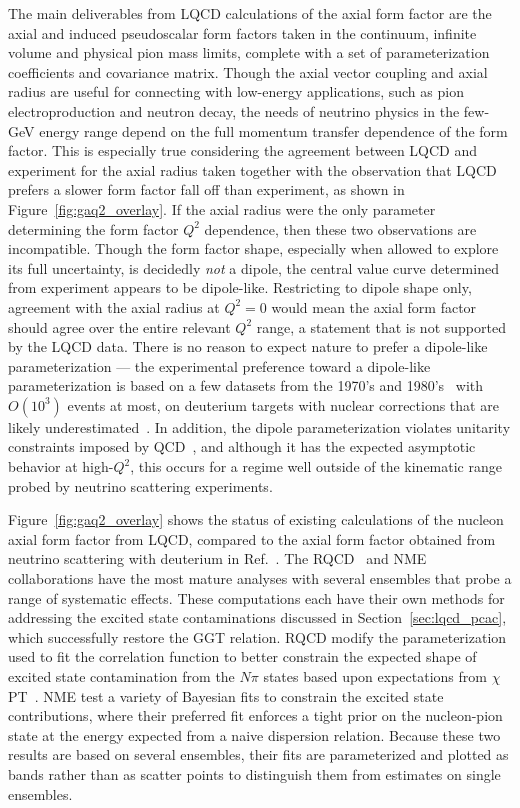 \documentclass{ar-1col}
\def\asm#1{{\color{blue}#1}}
\begin{document}
The main deliverables from LQCD calculations of the axial form factor
 are the axial and induced pseudoscalar form factors taken in the continuum,
 infinite volume and physical pion mass limits, complete with a set of parameterization coefficients
 and covariance matrix.
Though the axial \asm{vector coupling}
 and \asm{axial }radius are useful for connecting with low-energy applications,
 such as pion electroproduction and neutron decay,
 the needs of neutrino physics in the few-GeV energy range depend
 on the full momentum transfer dependence of the form factor.
 This is especially true considering the agreement between LQCD and experiment
 for the axial radius taken together with the observation that
 LQCD prefers a slower form factor fall off than experiment,
 as shown in Figure~\ref{fig:gaq2_overlay}.
If the axial radius were the only parameter determining the form factor $Q^2$ dependence,
 then these two observations are incompatible.
Though the form factor shape, especially when allowed to explore its full uncertainty,
 is decidedly \emph{not} a dipole, the central value curve determined
 from experiment appears to be dipole-like.
Restricting to dipole shape only, agreement with the axial radius at $Q^2=0$
 would mean the axial form factor should agree over the entire relevant $Q^2$ range,
 a statement that is not supported by the LQCD data.
There is no reason to expect nature to prefer a dipole-like parameterization ---
 the experimental preference toward a dipole-like parameterization is based on
 a few datasets from the 1970's and 1980's~\cite{ANL_Barish_1977, BNL_Baker_1981, Kitagaki:1983px}
 with $O(10^3)$ events at most,
 on deuterium targets with nuclear corrections that are likely underestimated~\cite{Meyer:2016oeg}.
In addition, the dipole parameterization violates
 unitarity constraints imposed by QCD~\cite{Bhattacharya:2011ah},
 and although it has the expected asymptotic behavior at high-$Q^2$,
 this occurs for a regime well outside of the kinematic range probed
 by neutrino scattering experiments.



Figure~\ref{fig:gaq2_overlay} shows the status of existing calculations of
 the nucleon axial form factor from LQCD,
 compared to the axial form factor obtained from neutrino scattering
 with deuterium in Ref.~\cite{Meyer:2016oeg}.
The RQCD~\cite{RQCD:2019jai} and NME~\cite{Park:2021ypf} collaborations
 have the most mature analyses with several ensembles that probe a range of
 systematic effects.
These computations each have their own methods for addressing the
 excited state contaminations discussed in Section~\ref{sec:lqcd_pcac},
 which successfully restore the GGT relation.
RQCD modify the parameterization used to fit the correlation function
 to better constrain the expected shape of excited state contamination from the $N\pi$ states based upon expectations from $\chi$PT~\cite{Bar:2018xyi}.
NME test a variety of Bayesian fits to constrain the excited state contributions,
 where their preferred fit enforces a tight prior on the nucleon-pion state
 at the energy expected from a naive dispersion relation.
Because these two results are based on several ensembles,
 their fits are parameterized and plotted as bands rather than as scatter points
 to distinguish them from estimates on single ensembles.
\end{document}
